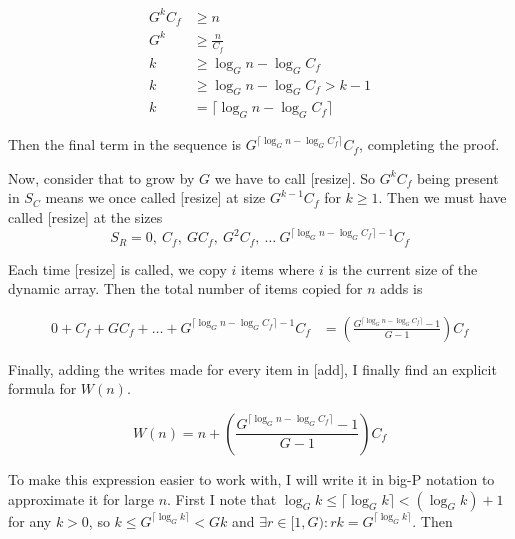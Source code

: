 \documentclass{article}
\newcommand{\nwritesfn}{W}
\newcommand{\varnitems}{n}
\newcommand{\initcapacity}{C_f}
\newcommand{\growthfactor}{G}
\begin{document}
	\begin{align*}
	\growthfactor^k\initcapacity &\geq \varnitems\\
	\growthfactor^k &\geq \frac{\varnitems}{\initcapacity}\\
	k &\geq \log_{\growthfactor} \varnitems - \log_{\growthfactor} \initcapacity\\
	k &\geq \log_{\growthfactor} \varnitems - \log_{\growthfactor} \initcapacity > k - 1\\
	k &= \big\lceil \log_{\growthfactor} \varnitems - \log_{\growthfactor} \initcapacity \big\rceil
	\end{align*}
	
	Then the final term in the sequence is $\growthfactor^{\lceil \log_{\growthfactor} \varnitems - \log_{\growthfactor} \initcapacity \rceil}\initcapacity$, completing the proof.
	
	Now, consider that to grow by $\growthfactor$ we have to call [resize]. So $\growthfactor^k\initcapacity$ being present in $S_C$ means we once called [resize] at size $\growthfactor^{k - 1}\initcapacity$ for $k \geq 1$. Then we must have called [resize] at the sizes $$S_R = 0,\ \initcapacity,\ \growthfactor\initcapacity,\ \growthfactor^2\initcapacity,\ \ldots\ \growthfactor^{\lceil \log_{\growthfactor} \varnitems - \log_{\growthfactor} \initcapacity \rceil - 1}\initcapacity$$
	
	Each time [resize] is called, we copy $i$ items where $i$ is the current size of the dynamic array. Then the total number of items copied for $\varnitems$ adds is
	
	\begin{align*}
	0 + \initcapacity + \growthfactor\initcapacity + \ldots + \growthfactor^{\lceil \log_{\growthfactor} \varnitems - \log_{\growthfactor} \initcapacity \rceil - 1}\initcapacity &= \left( \frac{\growthfactor^{\lceil \log_{\growthfactor} \varnitems - \log_{\growthfactor} \initcapacity \rceil} - 1}{\growthfactor - 1} \right) \initcapacity
	\end{align*}
	
	Finally, adding the writes made for every item in [add], I finally find an explicit formula for $\nwritesfn(\varnitems)$.
	
	$$
	\nwritesfn(\varnitems) = \varnitems + \left( \frac{\growthfactor^{\lceil \log_{\growthfactor} \varnitems - \log_{\growthfactor} \initcapacity \rceil} - 1}{\growthfactor - 1} \right) \initcapacity
	$$
	
	To make this expression easier to work with, I will write it in big-P notation to approximate it for large $\varnitems$. First I note that $\log_{\growthfactor} k \leq \lceil \log_{\growthfactor} k \rceil < \left( \log_{\growthfactor} k \right) + 1$ for any $k > 0$, so $k \leq \growthfactor^{\lceil \log_{\growthfactor} k \rceil} < \growthfactor{k}$ and $\exists r \in {[1, \growthfactor)} : rk = \growthfactor^{\lceil \log_{\growthfactor} k \rceil}$. Then
	
\end{document}
